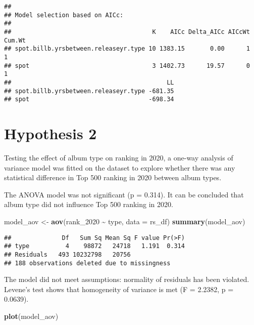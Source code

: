 \documentclass[
]{article}
\newenvironment{Shaded}{\begin{snugshade}}{\end{snugshade}}
\newcommand{\AttributeTok}[1]{\textcolor[rgb]{0.13,0.29,0.53}{#1}}
\newcommand{\FunctionTok}[1]{\textcolor[rgb]{0.13,0.29,0.53}{\textbf{#1}}}
\newcommand{\NormalTok}[1]{#1}
\newcommand{\OtherTok}[1]{\textcolor[rgb]{0.56,0.35,0.01}{#1}}
\newcommand{\SpecialCharTok}[1]{\textcolor[rgb]{0.81,0.36,0.00}{\textbf{#1}}}
\begin{document}
\begin{verbatim}
## 
## Model selection based on AICc:
## 
##                                       K    AICc Delta_AICc AICcWt Cum.Wt
## spot.billb.yrsbetween.releaseyr.type 10 1383.15       0.00      1      1
## spot                                  3 1402.73      19.57      0      1
##                                           LL
## spot.billb.yrsbetween.releaseyr.type -681.35
## spot                                 -698.34
\end{verbatim}

\section{Hypothesis 2}\label{hypothesis-2}

Testing the effect of album type on ranking in 2020, a one-way analysis
of variance model was fitted on the dataset to explore whether there was
any statistical difference in Top 500 ranking in 2020 between album
types.

The ANOVA model was not significant (p = 0.314). It can be concluded
that album type did not influence Top 500 ranking in 2020.

\begin{Shaded}
\begin{Highlighting}[]
\NormalTok{model\_aov }\OtherTok{\textless{}{-}} \FunctionTok{aov}\NormalTok{(rank\_2020 }\SpecialCharTok{\textasciitilde{}}\NormalTok{ type, }\AttributeTok{data =}\NormalTok{ rs\_df)}
\FunctionTok{summary}\NormalTok{(model\_aov)}
\end{Highlighting}
\end{Shaded}

\begin{verbatim}
##              Df   Sum Sq Mean Sq F value Pr(>F)
## type          4    98872   24718   1.191  0.314
## Residuals   493 10232798   20756               
## 188 observations deleted due to missingness
\end{verbatim}

The model did not meet assumptions: normality of residuals has been
violated. Levene's test shows that homogeneity of variance is met (F =
2.2382, p = 0.0639).

\begin{Shaded}
\begin{Highlighting}[]
\FunctionTok{plot}\NormalTok{(model\_aov)}
\end{Highlighting}
\end{Shaded}
\end{document}
